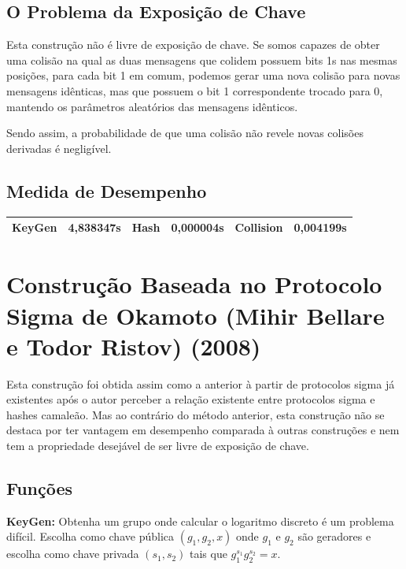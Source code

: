 \documentclass[a4paper]{article}
\begin{document}
 \subsection{O Problema da Exposição de Chave}
 
 Esta construção não é livre de exposição de chave. Se somos capazes de
 obter uma colisão na qual as duas mensagens que colidem possuem bits
 1s nas mesmas posições, para cada bit 1 em comum, podemos gerar uma
 nova colisão para novas mensagens idênticas, mas que possuem o bit 1
 correspondente trocado para 0, mantendo os parâmetros aleatórios das
 mensagens idênticos.
 
 Sendo assim, a probabilidade de que uma colisão não revele novas
 colisões derivadas é negligível.
 
 \subsection{Medida de Desempenho}
 
 \begin{center}
 \begin{tabular}{|c|c|c|c|c|c|}
 \hline
 KeyGen & 4,838347s & Hash & 0,000004s & Collision & 0,004199s\\
 \hline
 \end{tabular}
 \end{center}
 
 \section{Construção Baseada no Protocolo Sigma de Okamoto
 (Mihir Bellare e Todor Ristov) (2008)\cite{sigma}}
 
 Esta construção foi obtida assim como a anterior à partir de
 protocolos sigma já existentes após o autor perceber a relação
 existente entre protocolos sigma e hashes camaleão. Mas ao contrário
 do método anterior, esta construção não se destaca por ter vantagem em
 desempenho comparada à outras construções e nem tem a propriedade
 desejável de ser livre de exposição de chave.
 
 \subsection{Funções}
 
 \textbf{KeyGen: } Obtenha um grupo onde calcular o logaritmo discreto
 é um problema difícil. Escolha como chave pública $(g_1, g_2, x)$ onde
 $g_1$ e $g_2$ são geradores e escolha como chave privada $(s_1, s_2)$
 tais que $g_1^{s_1}g_2^{s_2} = x$.
 
\end{document}
